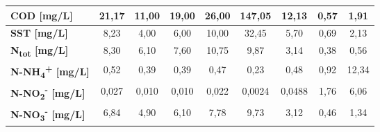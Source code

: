 \begin{sidewaystable}[h]
\begin{center}
\begin{tabular}{lcccccccc}
		\multicolumn{1}{|l|}{\textbf{COD {[}mg/L{]}}}           & \multicolumn{1}{c|}{21,17}          & \multicolumn{1}{c|}{11,00}                   & \multicolumn{1}{c|}{19,00}            & \multicolumn{1}{c|}{26,00}                   & \multicolumn{1}{c|}{147,05}            & \multicolumn{1}{c|}{12,13}             & \multicolumn{1}{c|}{0,57}        & \multicolumn{1}{c|}{1,91}           \\ \hline
		\multicolumn{1}{|l|}{\textbf{SST {[}mg/L{]}}}           & \multicolumn{1}{c|}{8,23}           & \multicolumn{1}{c|}{4,00}                    & \multicolumn{1}{c|}{6,00}             & \multicolumn{1}{c|}{10,00}                   & \multicolumn{1}{c|}{32,45}             & \multicolumn{1}{c|}{5,70}              & \multicolumn{1}{c|}{0,69}        & \multicolumn{1}{c|}{2,13}           \\ \hline
		\multicolumn{1}{|l|}{\textbf{N\textsubscript{tot} {[}mg/L{]}}}          & \multicolumn{1}{c|}{8,30}           & \multicolumn{1}{c|}{6,10}                    & \multicolumn{1}{c|}{7,60}             & \multicolumn{1}{c|}{10,75}                   & \multicolumn{1}{c|}{9,87}              & \multicolumn{1}{c|}{3,14}              & \multicolumn{1}{c|}{0,38}        & \multicolumn{1}{c|}{0,56}           \\ \hline
		\multicolumn{1}{|l|}{\textbf{N-NH\textsubscript{4}\textsuperscript{+} {[}mg/L{]}}}        & \multicolumn{1}{c|}{0,52}           & \multicolumn{1}{c|}{0,39}                    & \multicolumn{1}{c|}{0,39}             & \multicolumn{1}{c|}{0,47}                    & \multicolumn{1}{c|}{0,23}              & \multicolumn{1}{c|}{0,48}              & \multicolumn{1}{c|}{0,92}        & \multicolumn{1}{c|}{12,34}          \\ \hline
		\multicolumn{1}{|l|}{\textbf{N-NO\textsubscript{2}\textsuperscript{-} {[}mg/L{]}}}        & \multicolumn{1}{c|}{0,027}          & \multicolumn{1}{c|}{0,010}                   & \multicolumn{1}{c|}{0,010}            & \multicolumn{1}{c|}{0,022}                   & \multicolumn{1}{c|}{0,0024}            & \multicolumn{1}{c|}{0,0488}            & \multicolumn{1}{c|}{1,76}        & \multicolumn{1}{c|}{6,06}           \\ \hline
		\multicolumn{1}{|l|}{\textbf{N-NO\textsubscript{3}\textsuperscript{-} {[}mg/L{]}}}        & \multicolumn{1}{c|}{6,84}           & \multicolumn{1}{c|}{4,90}                    & \multicolumn{1}{c|}{6,10}             & \multicolumn{1}{c|}{7,78}                    & \multicolumn{1}{c|}{9,73}              & \multicolumn{1}{c|}{3,12}              & \multicolumn{1}{c|}{0,46}        & \multicolumn{1}{c|}{1,34}           \\ \hline

\end{tabular}
\end{center}
\end{sidewaystable}
